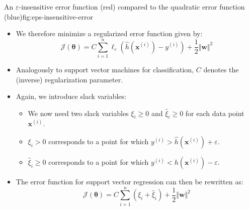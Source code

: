 \begin{frame}
	\dwFigure{}
		{An $\varepsilon$-insensitive error function (red) compared to the quadratic error function (blue)}{fig:eps-insensitive-error}
\end{frame}


\begin{frame}
	\begin{itemize}
		\item We therefore minimize a regularized error function given by:
		\begin{equation}
			\mathcal{J}(\bm{\theta}) = C \sum_{i=1}^n \ell_{\varepsilon}(\widehat{h}(\bm{x}^{(i)}) - y^{(i)}) + \frac{1}{2} \Vert \bm{w} \Vert^2
		\end{equation}
		\item Analogously to support vector machines for classification, $C$ denotes the (inverse) regularization parameter.
		\item Again, we introduce slack variables:
		\begin{itemize}
			\item We now need two slack variables $\xi_i \ge 0$ and $\widehat{\xi}_i \ge 0$ for each data point $\bm{x}^{(i)}$.
			\item $\xi_i > 0$ corresponds to a point for which $y^{(i)} > \widehat{h}(\bm{x}^{(i)}) + \varepsilon$.
			\item $\widehat{\xi}_i \ge 0$ corresponds to a point for which $y^{(i)} < h(\bm{x}^{(i)}) - \varepsilon$.
		\end{itemize}
		\item The error function for support vector regression can then be rewritten as:
		\begin{equation}
			\mathcal{J}(\bm{\theta}) = C \sum_{i=1}^n (\xi_i + \widehat{\xi}_i) + \frac{1}{2} \Vert \bm{w} \Vert^2
			\label{eq:svr-error-function}
		\end{equation}
	\end{itemize}
\end{frame}


\begin{frame}
\end{frame}



